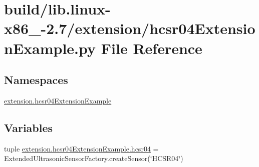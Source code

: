 \hypertarget{build_2lib_8linux-x86__64-2_87_2extension_2hcsr04ExtensionExample_8py}{}\section{build/lib.linux-\/x86\+\_-\/2.7/extension/hcsr04\+Extension\+Example.py File Reference}
\label{build_2lib_8linux-x86__64-2_87_2extension_2hcsr04ExtensionExample_8py}
\subsection*{Namespaces}
\begin{DoxyCompactItemize}
\item 
 \hyperlink{namespaceextension_1_1hcsr04ExtensionExample}{extension.\+hcsr04\+Extension\+Example}
\end{DoxyCompactItemize}
\subsection*{Variables}
\begin{DoxyCompactItemize}
\item 
tuple \hyperlink{namespaceextension_1_1hcsr04ExtensionExample_a5d51d12a03fdd93c0aa6f2bffc25d3d5}{extension.\+hcsr04\+Extension\+Example.\+hcsr04} = Extended\+Ultrasonic\+Sensor\+Factory.\+create\+Sensor(\char`\"{}H\+C\+S\+R04\char`\"{})
\end{DoxyCompactItemize}
